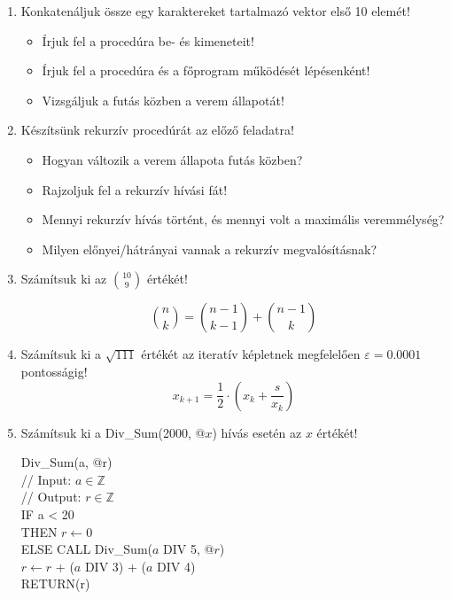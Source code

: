 \documentclass[a4paper]{article}
\begin{document}
\begin{enumerate}

\item

Konkatenáljuk össze egy karaktereket tartalmazó vektor első 10 elemét!
\begin{itemize}
	\item Írjuk fel a procedúra be- és kimeneteit!
	\item Írjuk fel a procedúra és a főprogram működését lépésenként!
	\item Vizsgáljuk a futás közben a verem állapotát!
\end{itemize}

\item

Készítsünk rekurzív procedúrát az előző feladatra!
\begin{itemize}
	\item Hogyan változik a verem állapota futás közben?
	\item Rajzoljuk fel a rekurzív hívási fát!
	\item Mennyi rekurzív hívás történt, és mennyi volt a maximális veremmélység?
	\item Milyen előnyei/hátrányai vannak a rekurzív megvalósításnak?
\end{itemize}

\item

Számítsuk ki az $\binom{10}{9}$ értékét!

$$
\binom{n}{k} = \binom{n-1}{k-1} + \binom{n-1}{k}
$$

\item Számítsuk ki a $\sqrt{111}$ értékét az iteratív képletnek megfelelően $\varepsilon = 0.0001$ pontosságig!
$$
x_{k+1} = \dfrac{1}{2} \cdot \left( x_k + \dfrac{s}{x_k} \right)
$$

\item

Számítsuk ki a Div\_Sum(2000, @$x$) hívás esetén az $x$ értékét!

Div\_Sum(a, @r) \\
// Input: $a \in \mathbb{Z}$ \\
// Output: $r \in \mathbb{Z}$ \\
IF a < 20 \\
\indent \quad THEN $r \leftarrow 0$ \\
\indent \quad ELSE CALL Div\_Sum($a$ DIV 5, @$r$) \\
\indent \quad \quad \quad $r \leftarrow r$ + ($a$ DIV 3) + ($a$ DIV 4) \\
RETURN(r)


\end{enumerate}
\end{document}
